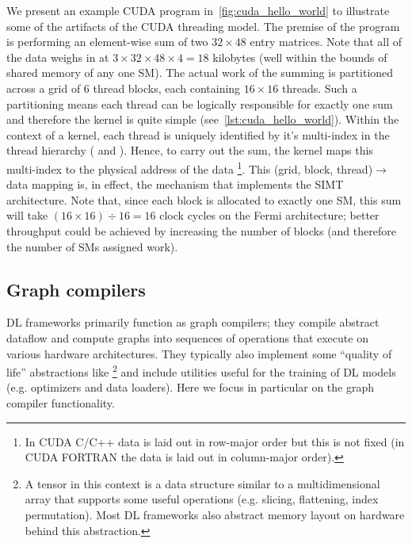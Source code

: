 \documentclass[sigconf]{acmart}
\begin{document}
We present an example CUDA program in~\cref{fig:cuda_hello_world} to illustrate some of the artifacts of the CUDA threading model.
The premise of the program is performing an element-wise sum of two $32 \times 48$ entry matrices.
Note that all of the data weighs in at  $3 \times 32 \times 48 \times 4 = 18$ kilobytes (well within the bounds of shared memory of any one SM).
The actual work of the summing is partitioned across a grid of 6 thread blocks, each containing $16 \times 16$ threads.
Such a partitioning means each thread can be logically responsible for exactly one sum and therefore the kernel is quite simple (see~\cref{lst:cuda_hello_world}).
Within the context of a kernel, each thread is uniquely identified by it's multi-index in the thread hierarchy ( and ).
Hence, to carry out the sum, the kernel maps this multi-index to the physical address of the data%
\footnote{In CUDA C/C++ data is laid out in row-major order but this is not fixed (in CUDA FORTRAN the data is laid out in column-major order).}.
This (grid, block, thread)$\rightarrow$data mapping is, in effect, the mechanism that implements the SIMT architecture.
Note that, since each block is allocated to exactly one SM, this sum will take $\left( 16 \times 16 \right) \div 16 = 16$ clock cycles on the Fermi architecture;
better throughput could be achieved by increasing the number of blocks (and therefore the number of SMs assigned work).







\subsection{Graph compilers}\label{subsec:graph-compilers}

DL frameworks primarily function as graph compilers;
they compile abstract dataflow and compute graphs into sequences of operations that execute on various hardware architectures.
They typically also implement some ``quality of life'' abstractions like %
\footnote{A tensor in this context is a data structure similar to a multidimensional array that supports some useful operations (e.g. slicing, flattening, index permutation). Most DL frameworks also abstract memory layout on hardware behind this abstraction.} and include utilities useful for the training of DL models (e.g. optimizers and data loaders).
Here we focus in particular on the graph compiler functionality.
\end{document}
